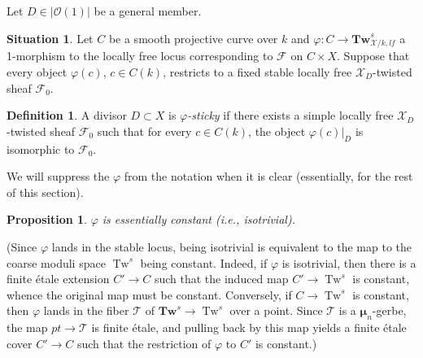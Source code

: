\documentclass[11pt]{amsart}
\newcommand{\ms}[1]{\mathscr #1}
\renewcommand{\phi}{\varphi}
\newcommand{\m}{\boldsymbol{\mu}}
\renewcommand{\[}{[\!\hspace{0.03em}[}
\renewcommand{\]}{]\!\hspace{0.03em}]}
\renewcommand{\(}{(\!\hspace{0.03em}(}
\renewcommand{\)}{)\!\hspace{0.03em})}
\newcommand{\Tw}{\mathbf{Tw}}
\DeclareMathOperator{\mTw}{Tw}
\newtheorem{prop}[lem]{Proposition}
\theoremstyle{definition}
\newtheorem{defn}[lem]{Definition}
\newtheorem{situation}[lem]{Situation}
\theoremstyle{remark}
\begin{document}
Let $D\in|{\ms O}(1)|$ be a general member.
\begin{situation} Let $C$ be a smooth projective curve over $k$ and 
$\phi:C\to\Tw^{s}_{\ms X/k,lf}$ a 1-morphism to the locally free locus 
corresponding to $\ms F$ on $C\times X$.  Suppose that 
every object $\phi(c)$, $c\in C(k)$, restricts to a fixed stable locally 
free $\ms X_{D}$-twisted sheaf $\ms F_{0}$.  
\end{situation}

\begin{defn} A divisor $D\subset X$ is \emph{$\phi$-sticky\/} if there exists a simple locally free $\ms X_D$-twisted sheaf $\ms F_0$ such that for every $c\in C(k)$, the object $\phi(c)|_D$ is isomorphic to $\ms F_0$.
\end{defn}
We will suppress the $\phi$ from the notation when it is clear (essentially, for the rest of this section).

\begin{prop}\label{P:no curves inside}
$\phi$ is essentially constant (i.e., isotrivial).
\end{prop}
(Since $\phi$ lands in the stable locus, being isotrivial is 
equivalent to the map to the coarse moduli space $\mTw^{s}$ being 
constant.  Indeed, if $\phi$ is isotrivial, then there is a finite 
\'etale extension $C'\to C$ such that the induced map $C'\to\mTw^{s}$ 
is constant, whence the original map must be constant.  Conversely, 
if $C\to\mTw^{s}$ is constant, then $\phi$ lands in the fiber $\ms T$ of 
$\Tw^{s}\to\mTw^{s}$ over a point.  Since $\ms T$ is a $\m_{n}$-gerbe, 
the map $pt\to\ms T$ is finite \'etale, and pulling back by this map 
yields a finite \'etale cover $C'\to C$ such that the restriction of 
$\phi$ to $C'$ is constant.)
\end{document}

